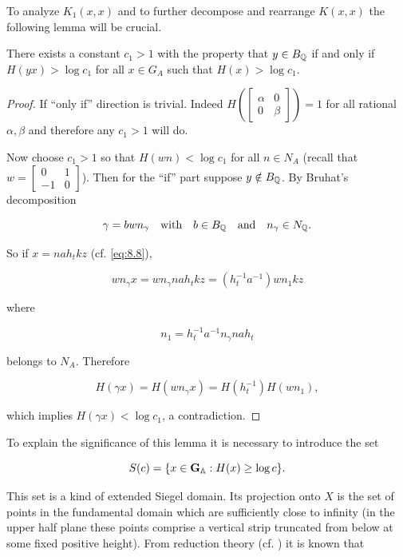 To analyze $K_1(x,x)$ and to further decompose and rearrange $K(x,x)$ the following lemma will be crucial.

\begin{lemma}\label{lem:9.8}

There exists a constant $c_1 > 1$ with the property that $y \in B_{\mathbb{Q}}$ if and only if $H(yx) > \log c_1$ for all $x \in G_A$ such that $H(x) > \log c_1$.

\end{lemma}

\begin{proof}

If ``only if'' direction is trivial. Indeed $H\left(\begin{bmatrix} \alpha & 0 \\ 0 & \beta \end{bmatrix}\right) = 1$ for all rational $\alpha, \beta$ and therefore any $c_1 > 1$ will do.

Now choose $c_1 > 1$ so that $H(wn) < \log c_1$ for all $n \in N_A$ (recall that $w = \begin{bmatrix} 0 & 1 \\ -1 & 0 \end{bmatrix}$). Then for the ``if'' part suppose $y \notin B_{\mathbb{Q}}$. By Bruhat's decomposition

\[
\gamma = bwn_\gamma \quad \text{with} \quad b \in B_{\mathbb{Q}} \quad \text{and} \quad n_\gamma \in N_{\mathbb{Q}}.
\]

So if $x = nah_tkz$ (cf. \eqref{eq:8.8}),

\[
wn_\gamma x = wn_\gamma nah_tkz = (h_t^{-1}a^{-1})wn_1kz
\]

where

\[
n_1 = h_t^{-1}a^{-1}n_\gamma nah_t
\]

belongs to $N_A$. Therefore

\[
H(\gamma x) = H(wn_\gamma x) = H(h_t^{-1})H(wn_1),
\]

which implies $H(\gamma x) < \log c_1$, a contradiction.

\end{proof}

To explain the significance of this lemma it is necessary to introduce the set

\[
S(c) = \{x \in \mathbf{G}_{\mathbb{A}}: H(x) \geq \log c\}.
\]

This set is a kind of extended Siegel domain. Its projection onto $X$ is the set of points in the fundamental domain which are sufficiently close to infinity (in the upper half plane these points comprise a vertical strip truncated from below at some fixed positive height). From reduction theory (cf. \cite{Godement3}) it is known that

